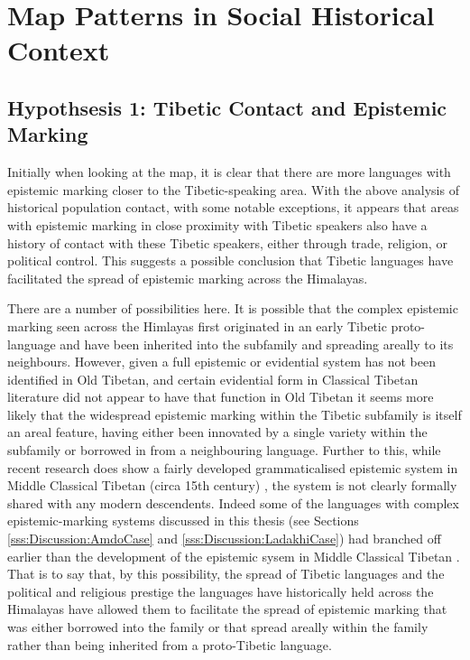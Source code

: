 \section{Map Patterns in Social Historical Context}\label{s:History:Correlations}
\subsection{Hypothsesis 1: Tibetic Contact and Epistemic Marking}
Initially when looking at the map, it is clear that there are more languages with epistemic marking closer to the Tibetic-speaking area. With the above analysis of historical population contact, with some notable exceptions, it appears that areas with epistemic marking in close proximity with Tibetic speakers also have a history of contact with these Tibetic speakers, either through trade, religion, or political control. This suggests a possible conclusion that Tibetic languages have facilitated the spread of epistemic marking across the Himalayas. 

There are a number of possibilities here. It is possible that the complex epistemic marking seen across the Himlayas first originated in an early Tibetic proto-language and have been inherited into the subfamily and spreading areally to its neighbours. However, given a full epistemic or evidential system has not been identified in Old Tibetan, and certain evidential form in Classical Tibetan literature did not appear to have that function in Old Tibetan \cite{Hill2014} it seems more likely that the widespread epistemic marking within the Tibetic subfamily is itself an areal feature, having either been innovated by a single variety within the subfamily or borrowed in from a neighbouring language. Further to this, while recent research does show a fairly developed grammaticalised epistemic system in Middle Classical Tibetan (circa 15th century) \cite{Oisel2024}, the system is not clearly formally shared with any modern descendents. Indeed some of the languages with complex epistemic-marking systems discussed in this thesis (see Sections \ref{sss:Discussion:AmdoCase} and \ref{sss:Discussion:LadakhiCase}) had branched off earlier than the development of the epistemic sysem in Middle Classical Tibetan \cite{Bialek2018}. That is to say that, by this possibility, the spread of Tibetic languages and the political and religious prestige the languages have historically held across the Himalayas have allowed them to facilitate the spread of epistemic marking that was either borrowed into the family or that spread areally within the family rather than being inherited from a proto-Tibetic language.

